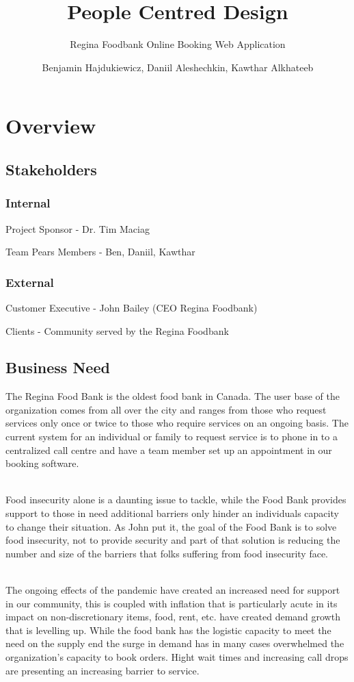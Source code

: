 \documentclass[english,course]{lecture}
\title{People Centred Design}
\subtitle{Regina Foodbank Online Booking Web Application}
\author{Benjamin Hajdukiewicz, Daniil Aleshechkin, Kawthar Alkhateeb}
\begin{document}
\section{Overview}
\subsection{Stakeholders}
\subsubsection{Internal}
Project Sponsor - Dr. Tim Maciag

Team Pears Members - Ben, Daniil, Kawthar

\subsubsection{External}
Customer Executive - John Bailey (CEO Regina Foodbank)

Clients - Community served by the Regina Foodbank

\subsection{Business Need}
The Regina Food Bank is the oldest food bank in Canada. The user base of the organization comes from all over the city and ranges from those who request services only once or twice to those who require services on an ongoing basis. The current system for an individual or family to request service is to phone in to a centralized call centre and have a team member set up an appointment in our booking software.

\\Food insecurity alone is a daunting issue to tackle, while the Food Bank provides support to those in need additional barriers only hinder an individuals capacity to change their situation. As John put it, the goal of the Food Bank is to solve food insecurity, not to provide security and part of that solution is reducing the number and size of the barriers that folks suffering from food insecurity face.

\\The ongoing effects of the pandemic have created an increased need for support in our community, this is coupled with inflation that is particularly acute in its impact on non-discretionary items, food, rent, etc. have created demand growth that is levelling up. While the food bank has the logistic capacity to meet the need on the supply end the surge in demand has in many cases overwhelmed the organization’s capacity to book orders. Hight wait times and increasing call drops are presenting an increasing barrier to service.
\end{document}

